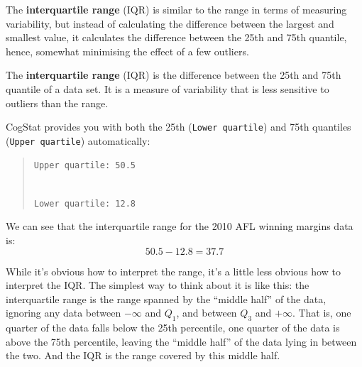 \documentclass[
  11pt,
  a4paper,
  twoside,symmetric,openright]{book}
\theoremstyle{break}
\theoremstyle{break}
\begin{document}
The \textbf{interquartile range} (IQR) is similar to the range in terms of measuring variability, but instead of calculating the difference between the largest and smallest value, it calculates the difference between the 25th and 75th quantile, hence, somewhat minimising the effect of a few outliers.

\begin{definition}
\protect\hypertarget{def:defIQR}{}\label{def:defIQR}The \textbf{interquartile range} (IQR) is the difference between the 25th and 75th quantile of a data set. It is a measure of variability that is less sensitive to outliers than the range.
\end{definition}

CogStat provides you with both the 25th (\texttt{Lower\ quartile}) and 75th quantiles (\texttt{Upper\ quartile}) automatically:

\begin{quote}
\texttt{Upper\ quartile:\ 50.5}\strut \\
\texttt{Lower\ quartile:\ 12.8}
\end{quote}

\begin{example}
\protect\hypertarget{exm:exIQR}{}\label{exm:exIQR}We can see that the interquartile range for the 2010 AFL winning margins data is:
\[
50.5 - 12.8 = \mathbf{37.7}
\]
\end{example}

While it's obvious how to interpret the range, it's a little less obvious how to interpret the IQR. The simplest way to think about it is like this: the interquartile range is the range spanned by the ``middle half'' of the data, ignoring any data between \(-\infty\) and \(Q_1\), and between \(Q_3\) and \(+\infty\). That is, one quarter of the data falls below the 25th percentile, one quarter of the data is above the 75th percentile, leaving the ``middle half'' of the data lying in between the two. And the IQR is the range covered by this middle half.
\end{document}

